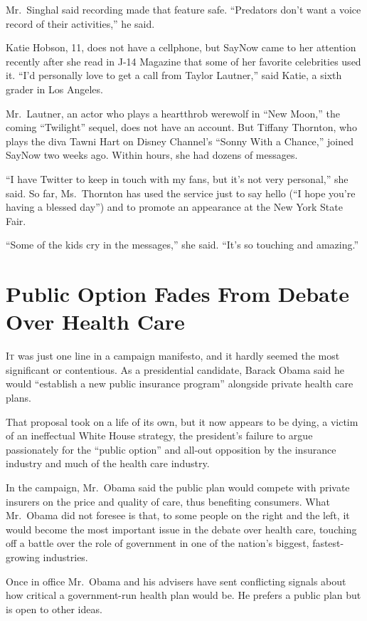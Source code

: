 ﻿\documentclass[12pt]{article}
\begin{document}
Mr.~Singhal said recording made that feature safe. ``Predators don't want a voice record of their
activities,'' he said.

Katie Hobson, 11, does not have a cellphone, but SayNow came to her attention recently after she
read in J-14 Magazine that some of her favorite celebrities used it. ``I'd personally love to get a
call from Taylor Lautner,'' said Katie, a sixth grader in Los Angeles.

Mr.~Lautner, an actor who plays a heartthrob werewolf in ``New Moon,'' the coming ``Twilight''
sequel, does not have an account. But Tiffany Thornton, who plays the diva Tawni Hart on Disney
Channel's ``Sonny With a Chance,'' joined SayNow two weeks ago. Within hours, she had dozens of
messages.

``I have Twitter to keep in touch with my fans, but it's not very personal,'' she said. So far,
Ms.~Thornton has used the service just to say hello (``I hope you're having a blessed day'') and to
promote an appearance at the New York State Fair.

``Some of the kids cry in the messages,'' she said. ``It's so touching and amazing.''

\section{Public Option Fades From Debate Over Health Care}

\lettrine{I}{t} was just one line in a campaign manifesto\cite{manifesto}, and it hardly seemed the
most significant or contentious. As a presidential candidate, Barack Obama said he would ``establish
a new public insurance program'' alongside private health care plans.

That proposal took on a life of its own, but it now appears to be dying, a victim of an ineffectual
White House strategy, the president's failure to argue passionately for the ``public option'' and
all-out opposition by the insurance industry and much of the health care industry.

In the campaign, Mr.~Obama said the public plan would compete with private insurers on the price and
quality of care, thus benefiting consumers. What Mr.~Obama did not foresee is that, to some people
on the right and the left, it would become the most important issue in the debate over health care,
touching off a battle over the role of government in one of the nation's biggest, fastest-growing
industries.

Once in office Mr.~Obama and his advisers have sent conflicting signals about how critical a
government-run health plan would be. He prefers a public plan but is open to other ideas.
\end{document}
